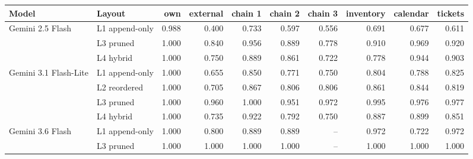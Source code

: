 \begin{tabular}{llrrrrrrrr}
\toprule
\textbf{Model} & \textbf{Layout} & \textbf{own} & \textbf{external} & \textbf{chain 1} & \textbf{chain 2} & \textbf{chain 3} & \textbf{inventory} & \textbf{calendar} & \textbf{tickets} \\
\midrule
Gemini 2.5 Flash & L1 append-only & 0.988 & 0.400 & 0.733 & 0.597 & 0.556 & 0.691 & 0.677 & 0.611 \\
 & L3 pruned & 1.000 & 0.840 & 0.956 & 0.889 & 0.778 & 0.910 & 0.969 & 0.920 \\
 & L4 hybrid & 1.000 & 0.750 & 0.889 & 0.861 & 0.722 & 0.778 & 0.944 & 0.903 \\
\midrule
Gemini 3.1 Flash-Lite & L1 append-only & 1.000 & 0.655 & 0.850 & 0.771 & 0.750 & 0.804 & 0.788 & 0.825 \\
 & L2 reordered & 1.000 & 0.705 & 0.867 & 0.806 & 0.806 & 0.861 & 0.844 & 0.819 \\
 & L3 pruned & 1.000 & 0.960 & 1.000 & 0.951 & 0.972 & 0.995 & 0.976 & 0.977 \\
 & L4 hybrid & 1.000 & 0.735 & 0.922 & 0.792 & 0.750 & 0.887 & 0.899 & 0.851 \\
\midrule
Gemini 3.6 Flash & L1 append-only & 1.000 & 0.800 & 0.889 & 0.889 & -- & 0.972 & 0.722 & 0.972 \\
 & L3 pruned & 1.000 & 1.000 & 1.000 & 1.000 & -- & 1.000 & 1.000 & 1.000 \\
\bottomrule
\end{tabular}
